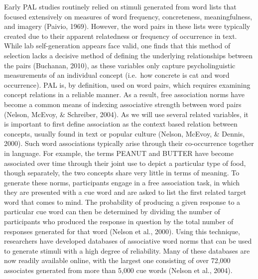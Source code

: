 \documentclass[english,man]{apa6}
\theoremstyle{definition}
\theoremstyle{definition}
\theoremstyle{remark}
\begin{document}
Early PAL studies routinely relied on stimuli generated from word lists
that focused extensively on measures of word frequency, concreteness,
meaningfulness, and imagery (Paivio, 1969). However, the word pairs in
these lists were typically created due to their apparent relatedness or
frequency of occurrence in text. While lab self-generation appears face
valid, one finds that this method of selection lacks a decisive method
of defining the underlying relationships between the pairs (Buchanan,
2010), as these variables only capture psycholinguistic measurements of
an individual concept (i.e.~how concrete is cat and word occurrence).
PAL is, by definition, used on word pairs, which requires examining
concept relations in a reliable manner. As a result, free association
norms have become a common means of indexing associative strength
between word pairs (Nelson, McEvoy, \& Schreiber, 2004). As we will use
several related variables, it is important to first define association
as the context based relation between concepts, usually found in text or
popular culture (Nelson, McEvoy, \& Dennis, 2000). Such word
associations typically arise through their co-occurrence together in
language. For example, the terms PEANUT and BUTTER have become
associated over time through their joint use to depict a particular type
of food, though separately, the two concepts share very little in terms
of meaning. To generate these norms, participants engage in a free
association task, in which they are presented with a cue word and are
asked to list the first related target word that comes to mind. The
probability of producing a given response to a particular cue word can
then be determined by dividing the number of participants who produced
the response in question by the total number of responses generated for
that word (Nelson et al., 2000). Using this technique, researchers have
developed databases of associative word norms that can be used to
generate stimuli with a high degree of reliability. Many of these
databases are now readily available online, with the largest one
consisting of over 72,000 associates generated from more than 5,000 cue
words (Nelson et al., 2004).
\end{document}
